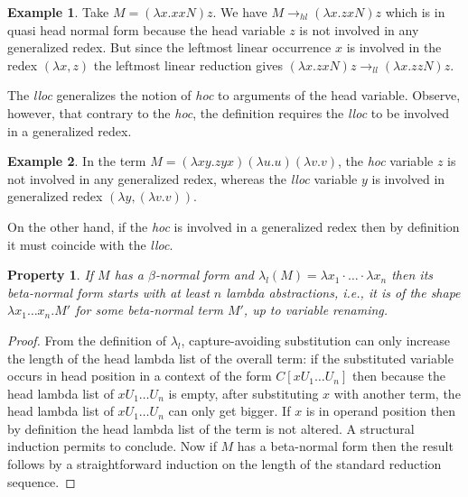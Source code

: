 \documentclass[xchauthor,chkrefs,GCNS,amsmath,amsthm,rotating,leaveRGB]{tcsg}
\theoremstyle{plain}
\newtheorem{property}[theorem]{Property}
\theoremstyle{definition}
\newtheorem{example}{Example}[section]
\newcommand{\hlred}{\rightarrow_{hl}}
\newcommand{\llred}{\rightarrow_{ll}}
\begin{document}
\begin{example}
Take $M = (\lambda x. x x N) z$. We have $M \hlred (\lambda x. z x N) z$
which is in quasi head normal form because the head variable $z$ is not
involved in any generalized redex. But since the leftmost linear occurrence
$x$ is involved in the redex $(\lambda x, z)$ the leftmost linear reduction
gives $(\lambda x. z x N) z \llred (\lambda x. z z N) z$.
\end{example}

The \emph{lloc} generalizes the notion of \emph{hoc} to arguments of the head
variable. Observe, however, that contrary to the \emph{hoc}, the definition
requires the \emph{lloc} to be involved in a generalized redex.

\begin{example}
In the term $M = (\lambda x y . z y x) (\lambda u . u) (\lambda v . v)$, the
\emph{hoc} variable $z$ is not involved in any generalized redex, whereas the
\emph{lloc} variable $y$ is involved in generalized redex $(\lambda y,
(\lambda v.v))$.
\end{example}

On the other hand, if the \emph{hoc} is involved in a generalized redex then
by definition it must coincide with the \emph{lloc}.

\begin{property}
If $M$ has a $\beta $-normal form and $\lambda _{l}(M) = \lambda x_{1} \cdot
\ldots \cdot \lambda x_{n}$ then its beta-normal form starts with at least
$n$ lambda abstractions, \textit{i.e.}, it is of the shape $\lambda x_{1}
\ldots x_{n} . M'$ for some beta-normal term $M'$, up to variable renaming.
\end{property}

\begin{proof}
From the definition of $\lambda _{l}$, capture-avoiding substitution can only
increase the length of the head lambda list of the overall term: if the
substituted variable occurs in head position in a context of the form $C[x
U_{1} \ldots U_{n}]$ then because the head lambda list of $x U_{1} \ldots
U_{n}$ is empty, after substituting $x$ with another term, the head lambda
list of $x U_{1} \ldots U_{n}$ can only get bigger. If $x$ is in operand
position then by definition the head lambda list of the term is not altered.
A structural induction permits to conclude. Now if $M$ has a beta-normal form
then the result follows by a straightforward induction on the length of the
standard reduction sequence.
\end{proof}
\end{document}
